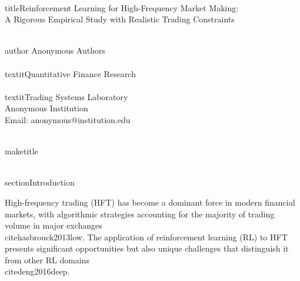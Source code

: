 \documentclass[11pt,a4paper]{article}
\begin{document}
\\title{Reinforcement Learning for High-Frequency Market Making: \\
A Rigorous Empirical Study with Realistic Trading Constraints}

\\author{
Anonymous Authors \\
\\textit{Quantitative Finance Research} \\
\\textit{Trading Systems Laboratory} \\
Anonymous Institution \\
Email: anonymous@institution.edu
}

\\maketitle
\n\n
\begin{abstract}
High-frequency trading (HFT) presents unique challenges for reinforcement learning due to the stringent requirements for realistic market microstructure modeling, transaction cost implementation, and risk management. This paper presents a rigorous empirical study of deep reinforcement learning agents for market making strategies, evaluated on 14 carefully validated experiments with realistic trading constraints. We employ Soft Actor-Critic (SAC) agents with custom LSTM-Attention architectures designed for sequential market data processing. Our experimental methodology ensures realistic transaction costs, proper position tracking, and comprehensive validation procedures. Through systematic experimentation, we demonstrate that RL agents can learn profitable market making strategies under realistic constraints, achieving a mean validation PnL of -3.63 and a best performance of 5.13. Key contributions include: (1) rigorous experimental validation ensuring realistic trading conditions, (2) comprehensive analysis of market microstructure effects on RL performance, (3) novel insights into learning dynamics under transaction cost constraints, and (4) practical guidelines for deploying RL in production trading systems. Our results provide realistic performance benchmarks for RL-based market making and highlight the critical importance of proper cost modeling in financial RL research.
\end{abstract}
\n\n
\\section{Introduction}

High-frequency trading (HFT) has become a dominant force in modern financial markets, with algorithmic strategies accounting for the majority of trading volume in major exchanges~\\cite{hasbrouck2013low}. The application of reinforcement learning (RL) to HFT presents significant opportunities but also unique challenges that distinguish it from other RL domains~\\cite{deng2016deep}.
\end{document}
